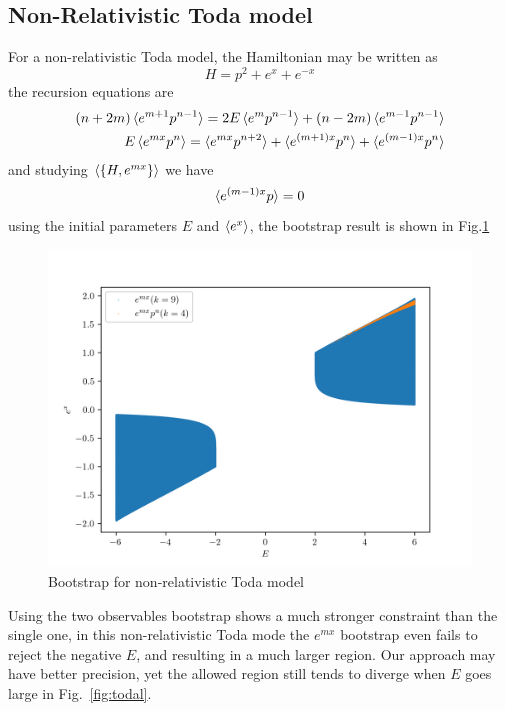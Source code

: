 \documentclass[aps, preprint,amsmath, amssymb]{revtex4-2}
\begin{document}
\subsection{Non-Relativistic Toda model}
For a non-relativistic Toda model, the Hamiltonian may be written as
\begin{equation}
    H = p^2 + e^x + e^{-x}
\end{equation}
the recursion equations are
\begin{align}
    (n + 2m)\braket{e^{m + 1} p^{n - 1}} = 2E\braket{e^m p^{n - 1}} + (n - 2m)\braket{e^{m - 1} p^{n - 1}}\notag \\
    E\braket{e^{mx} p^n} = \braket{e^{mx} p^{n + 2}} + \braket{e^{(m + 1)x} p^n} + \braket{e^{(m - 1)x} p^n}
\end{align}
and studying $\braket{\{H, e^{mx}\}}$ we have
\begin{equation}
    \braket{e^{(m - 1)x} p} = 0
\end{equation}
using the initial parameters $E$ and $\braket{e^x}$, the bootstrap result is shown in Fig.\ref{fig:toda}
\begin{figure}
    \includegraphics[width=0.8\linewidth]{toda_compare.png}
    \caption{Bootstrap for non-relativistic Toda model}
    \label{fig:toda}
\end{figure}

Using the two observables bootstrap shows a much stronger constraint than the single one, in this non-relativistic Toda mode the $e^{mx}$ bootstrap even fails to reject the negative $E$, and resulting in a much larger region. Our approach may have better precision, yet the allowed region still tends to diverge when $E$ goes large in Fig.~\ref{fig:todal}.
\end{document}

